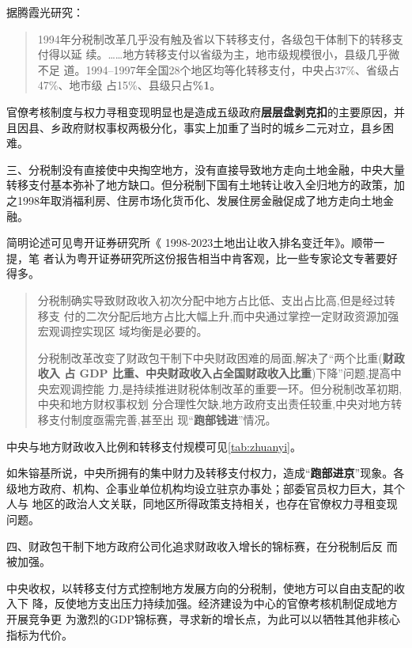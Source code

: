 据腾霞光研究：
\begin{quotation}
  1994年分税制改革几乎没有触及省以下转移支付，各级包干体制下的转移支付得以延
  续。……地方转移支付以省级为主，地市级规模很小，县级几乎微不足
  道。1994--1997年全国28个地区均等化转移支付，中央占37\%、省级占47\%、地市级
  占15\%、县级只占\textbf{\%1}。
\end{quotation}

官僚考核制度与权力寻租变现明显也是造成五级政府\textbf{层层盘剥克扣}的主要原因，并
且因县、乡政府财权事权两极分化，事实上加重了当时的城乡二元对立，县乡困难。


{\heiti 三、分税制没有直接使中央掏空地方，没有直接导致地方走向土地金融，中央大量
  转移支付基本弥补了地方缺口。但分税制下国有土地转让收入全归地方的政策，加
  之1998年取消福利房、住房市场化货币化、发展住房金融促成了地方走向土地金融。}

简明论述可见粤开证券研究所《 1998-2023土地出让收入排名变迁年》。顺带一提，笔
者认为粤开证券研究所这份报告相当中肯客观，比一些专家论文专著要好得多。
\begin{quotation}
  分税制确实导致财政收入初次分配中地方占比低、支出占比高,但是经过转移支
  付的二次分配后地方占比大幅上升,而中央通过掌控一定财政资源加强宏观调控实现区
  域均衡是必要的。

  分税制改革改变了财政包干制下中央财政困难的局面,解决了“两个比重(\textbf{财政收入
  占 GDP 比重、中央财政收入占全国财政收入比重})下降”问题,提高中央宏观调控能
  力,是持续推进财税体制改革的重要一环。但分税制改革初期,中央和地方财权事权划
  分合理性欠缺,地方政府支出责任较重,中央对地方转移支付制度亟需完善,甚至出
  现“\textbf{跑部钱进}”情况。
\end{quotation}

中央与地方财政收入比例和转移支付规模可见\cref{tab:zhuanyi}。

如朱镕基所说，中央所拥有的集中财力及转移支付权力，造成“\textbf{跑部进京}”现象。各
级地方政府、机构、企事业单位机构均设立驻京办事处；部委官员权力巨大，其个人与
地区的政治人文关联，同地区所得政策支持相关，也存在官僚权力寻租变现问题。

{\heiti 四、财政包干制下地方政府公司化追求财政收入增长的锦标赛，在分税制后反
  而被加强\cite{yangdi}。}

中央收权，以转移支付方式控制地方发展方向的分税制，使地方可以自由支配的收入下
降，反使地方支出压力持续加强。经济建设为中心的官僚考核机制促成地方开展竞争更
为激烈的GDP锦标赛，寻求新的增长点，为此可以以牺牲其他非核心指标为代价。

